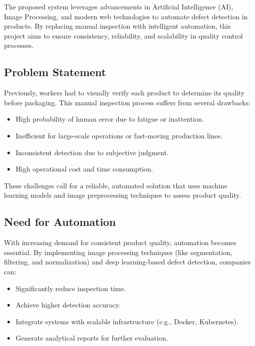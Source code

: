 \documentclass[12pt]{report}
\begin{document}
The proposed system leverages advancements in Artificial Intelligence (AI), Image Processing, and modern web technologies to automate defect detection in products. By replacing manual inspection with intelligent automation, this project aims to ensure consistency, reliability, and scalability in quality control processes.

\subsection{Problem Statement}

Previously, workers had to visually verify each product to determine its quality before packaging. This manual inspection process suffers from several drawbacks:

\begin{itemize}
  \item High probability of human error due to fatigue or inattention.
  \item Inefficient for large-scale operations or fast-moving production lines.
  \item Inconsistent detection due to subjective judgment.
  \item High operational cost and time consumption.
\end{itemize}

These challenges call for a reliable, automated solution that uses machine learning models and image preprocessing techniques to assess product quality.

\subsection{Need for Automation}

With increasing demand for consistent product quality, automation becomes essential. By implementing image processing techniques (like segmentation, filtering, and normalization) and deep learning-based defect detection, companies can:

\begin{itemize}
  \item Significantly reduce inspection time.
  \item Achieve higher detection accuracy.
  \item Integrate systems with scalable infrastructure (e.g., Docker, Kubernetes).
  \item Generate analytical reports for further evaluation.
\end{itemize}
\end{document}
